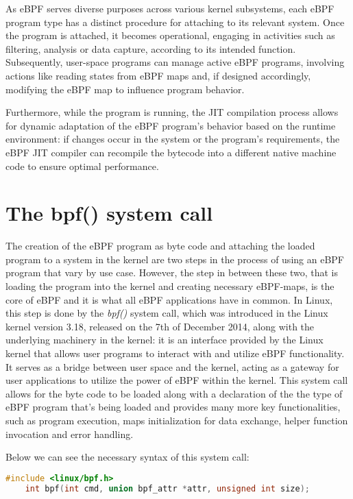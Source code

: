 As eBPF serves diverse purposes across various kernel subsystems, each eBPF program type has a distinct procedure for attaching to its relevant system. 
Once the program is attached, it becomes operational, engaging in activities such as filtering, analysis or data capture, according to its intended function. 
Subsequently, user-space programs can manage active eBPF programs, involving actions like reading states from eBPF maps and, if designed accordingly, modifying the eBPF map to influence program behavior.

Furthermore, while the program is running, the JIT compilation process allows for dynamic adaptation of the eBPF program's behavior based on the runtime environment: if changes occur in the system or the program's requirements, the eBPF JIT compiler can recompile the bytecode into a different native machine code to ensure optimal performance.

\section{The bpf() system call}


The creation of the eBPF program as byte code and attaching the loaded program to a system in the kernel are two steps in the process of using an eBPF program that vary by use case.
However, the step in between these two, that is loading the program into the kernel and creating necessary eBPF-maps, is the core of eBPF and it is what all eBPF applications have in common.
In Linux, this step is done by the \textit{bpf()} system call, which was introduced in the Linux kernel version 3.18, released on the 7th of December 2014, along with the underlying machinery in the kernel: it is an interface provided by the Linux kernel that allows user programs to interact with and utilize eBPF functionality. 
It serves as a bridge between user space and the kernel, acting as a gateway for user applications to utilize the power of eBPF within the kernel.
This system call allows for the byte code to be loaded along with a declaration of the the type of eBPF program that’s being loaded and provides many more key functionalities, such as program execution, maps initialization for data exchange, helper function invocation and error handling.

Below we can see the necessary syntax of this system call:

\begin{lstlisting}[language=C]
	#include <linux/bpf.h>
	int bpf(int cmd, union bpf_attr *attr, unsigned int size);
\end{lstlisting}

